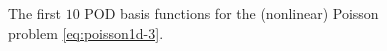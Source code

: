 \documentclass[12pt, a4paper, twoside, openright]{report}
\numberwithin{equation}{chapter}
\theoremstyle{theorem}
\theoremstyle{definition}
\theoremstyle{remark}
\theoremstyle{proposition}
\numberwithin{figure}{chapter}
\begin{document}
\begin{figure}[t]
			
			\caption{The first $10$ POD basis functions for the (nonlinear) Poisson problem \eqref{eq:poisson1d-3}.}
			\label{fig:poisson1d-3-fig1}
		\end{figure}
		
		\vspace*{-0.5cm}
		
\end{document}
